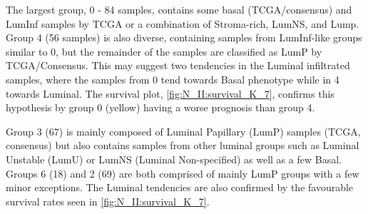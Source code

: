 The largest group, 0 - 84 samples, contains some basal (TCGA/consensus) and LumInf samples by TCGA or a combination of Stroma-rich, LumNS, and Lump. Group 4 (56 samples) is also diverse, containing samples from LumInf-like groups similar to 0, but the remainder of the samples are classified as LumP by TCGA/Consensus. This may suggest two tendencies in the Luminal infiltrated samples, where the samples from 0 tend towards Basal phenotype while in 4 towards Luminal. The survival plot, \cref{fig:N_II:survival_K_7}, confirms this hypothesis by group 0 (yellow) having a worse prognosis than group 4.

Group 3 (67) is mainly composed of Luminal Papillary (LumP) samples (TCGA, consensus) but also contains samples from other luminal groups such as Luminal Unstable (LumU) or LumNS (Luminal Non-specified) as well as a few Basal. Groups 6 (18) and 2 (69) are both comprised of mainly LumP groups with a few minor exceptions. The Luminal tendencies are also confirmed by the favourable survival rates seen in \cref{fig:N_II:survival_K_7}.

